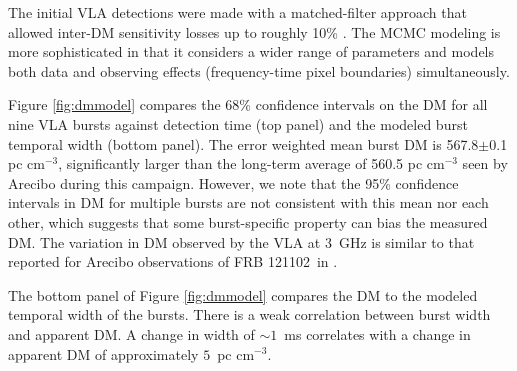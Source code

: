 \documentclass[twocolumn]{aastex61}
\newcommand{\frb}{FRB 121102}
\begin{document}
The initial VLA detections were made with a matched-filter approach that allowed inter-DM sensitivity losses up to roughly 10\% \citep[$\Delta \rm{DM}=10\ \rm{pc}\ \rm{cm}^{-3}$][]{2003ApJ...596.1142C}. 
The MCMC modeling is more sophisticated in that it considers a wider range of parameters and models both data and observing effects (frequency-time pixel boundaries) simultaneously.

Figure \ref{fig:dmmodel} compares the 68\% confidence intervals on the DM for all nine VLA bursts against detection time (top panel) and the modeled burst temporal width (bottom panel). The error weighted mean burst DM is 567.8$\pm$0.1 pc cm$^{-3}$, significantly larger than the long-term average of 560.5 pc cm$^{-3}$ seen by Arecibo during this campaign. However, we note that the 95\% confidence intervals in DM for multiple bursts are not consistent with this mean nor each other, which suggests that some burst-specific property can bias the measured DM. The variation in DM observed by the VLA at 3~GHz is similar to that reported for Arecibo observations of \frb\ in \citet{2016arXiv160308880S}.

The bottom panel of Figure \ref{fig:dmmodel} compares the DM to the modeled temporal width of the bursts. There is a weak correlation between burst width and apparent DM. A change in width of $\sim1$~ms correlates with a change in apparent DM of approximately $5$~pc cm$^{-3}$.
\end{document}
